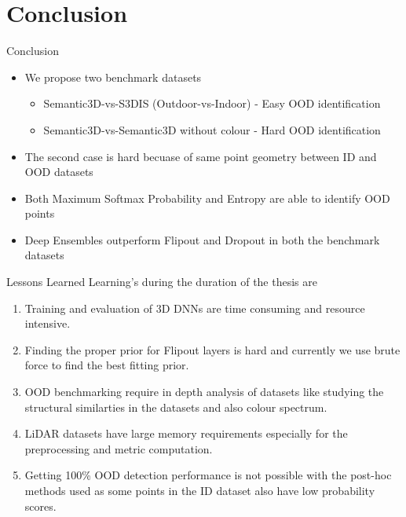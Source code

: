 \documentclass[aspectratio=169]{beamer}
\begin{document}
\section{Conclusion}
\begin{frame}{Conclusion}
    \begin{itemize}
        \item We propose two benchmark datasets 
        \begin{itemize}
            \item Semantic3D-vs-S3DIS (Outdoor-vs-Indoor) - Easy OOD identification
            \item Semantic3D-vs-Semantic3D without colour - Hard OOD identification
        \end{itemize}
        \item The second case is hard becuase of same point geometry between ID and OOD datasets
        \item Both Maximum Softmax Probability and Entropy are able to identify OOD points
        \item Deep Ensembles outperform Flipout and Dropout in both the benchmark datasets
    \end{itemize}
\end{frame}
\begin{frame}{Lessons Learned}
    Learning's during the duration of the thesis are
    \begin{enumerate}
        \item Training and evaluation of 3D DNNs are time consuming and resource intensive.
        \item Finding the proper prior for Flipout layers is hard and currently we use brute force to find the best fitting prior.
        \item OOD benchmarking require in depth analysis of datasets like studying the structural similarties in the datasets and also colour spectrum.
        \item LiDAR datasets have large memory requirements especially for the preprocessing and metric computation.
        \item Getting 100\% OOD detection performance is not possible with the post-hoc methods used as some points in the ID dataset also have low probability scores.
    \end{enumerate}
\end{frame}
\end{document}
